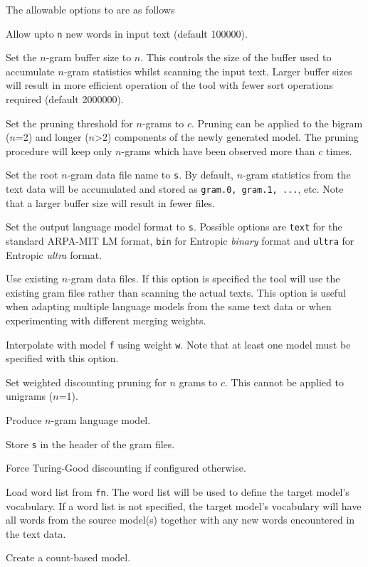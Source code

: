 The allowable options to  are as follows
\begin{optlist}
   Allow upto \texttt{n} new words in input text
        (default 100000).

   Set the $n$-gram buffer size to $n$. This controls the size of the
	buffer used to accumulate $n$-gram statistics whilst scanning the input
	text.  Larger buffer sizes will result in more efficient operation of
	the tool with fewer sort operations required (default 2000000).

   Set the pruning threshold for $n$-grams to $c$.  Pruning can
	be applied to the bigram ($n$=2) and longer ($n$>2) components of the
	newly generated model. The pruning procedure will keep only $n$-grams
	which have been observed more than $c$ times.

   Set the root $n$-gram data file name to {\tt s}. By default,
  	$n$-gram statistics from the text data will be accumulated and stored
  	as {\tt gram.0, gram.1, ...}, etc. Note that a larger buffer size will
  	result in fewer files.
        
   Set the output language model format to {\tt s}.
        Possible options are {\tt text} for the standard ARPA-MIT
	LM format, {\tt bin} for Entropic {\em binary} format and 
        {\tt ultra} for Entropic {\em ultra} format.

   Use existing $n$-gram data files. If this option is specified the
	tool will use the existing gram files rather than scanning the actual
	texts. This option is useful when adapting multiple language models
	from the same text data or when experimenting with different merging
	weights.

   Interpolate with model {\tt f} using weight {\tt w}. Note 
        that at least one model must be specified with this option.

   Set weighted discounting pruning for $n$ grams to
        $c$. This cannot be applied to unigrams ($n$=1).

   Produce $n$-gram language model.

   Store {\tt s} in the header of the gram files.

   Force Turing-Good discounting if configured otherwise.

   Load word list from {\tt fn}. The word list will be used to
	define the target model's vocabulary. If a word list is not specified,
	the target model's vocabulary will have all words from the source
	model(s) together with any new words encountered in the text
	data.

   Create a count-based model.
\end{optlist}

